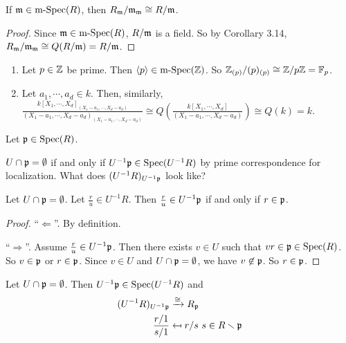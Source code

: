 \begin{corollary}\label{3.15}
    If $\mathfrak{m} \in \operatorname{m-Spec}(R)$, then $R_{\mathfrak{m}}/\mathfrak{m}_{\mathfrak{m}} \cong R/\mathfrak{m}$.
\end{corollary}

\begin{proof}
    Since $\mathfrak{m} \in \operatorname{m-Spec}(R)$, $R/\mathfrak{m}$ is a field. So by Corollary 3.14, $R_{\mathfrak{m}}/\mathfrak{m}_{\mathfrak{m}} \cong Q(R/\mathfrak{m}) = R/\mathfrak{m}$.
\end{proof}

\begin{example*}
    \begin{enumerate}
        \item Let $p \in \mathbb{Z}$ be prime. Then $\langle p \rangle \in \operatorname{m-Spec}(\mathbb{Z})$. So $\mathbb{Z}_{(p)}/(p)_{(p)} \cong \mathbb{Z}/p\mathbb{Z} = \mathbb{F}_p$.
        \item 
            Let $a_1,\cdots,a_d \in k$. Then, similarly, $\frac{k[X_1,\cdots,X_d]_{(X_1-a_1,\cdots,X_d-a_d)}}{(X_1-a_1,\cdots,X_d-a_d)_{(X_1-a_1,\cdots,X_d-a_d)}} \cong Q(\frac{k[X_1,\cdots,X_d]}{(X_1-a_1,\cdots,X_d-a_d)}) \cong Q(k) = k$. 
    \end{enumerate}
\end{example*}

\noindent Let $\mathfrak{p} \in \operatorname{Spec}(R)$. 

\begin{question*}
    $U \cap \mathfrak{p} = \emptyset$ if and only if $U^{-1}\mathfrak{p} \in \operatorname{Spec}(U^{-1}R)$ by prime correspondence for localization. What does $(U^{-1}R)_{U^{-1}\mathfrak{p}}$ look like?
\end{question*}

\begin{lemma}\label{3.16}
    Let $U \cap \mathfrak{p} = \emptyset$. Let $\frac{r}{u} \in U^{-1}R$. Then $\frac{r}{u} \in U^{-1}\mathfrak{p}$ if and only if $r \in \mathfrak{p}$. 
\end{lemma}

\begin{proof}
    ``$\Leftarrow$''. By definition. \par 
    ``$\Rightarrow$''. Assume $\frac{r}{u} \in U^{-1}\mathfrak{p}$. Then there exists $v \in U$ such that $vr \in \mathfrak{p} \in \operatorname{Spec}(R)$. So $v \in \mathfrak{p}$ or $r \in \mathfrak{p}$. Since $v \in U$ and $U \cap \mathfrak{p} = \emptyset$, we have $v \not \in \mathfrak{p}$. So $r \in \mathfrak{p}$.
\end{proof}

\begin{proposition}\label{3.17}
    Let $U \cap \mathfrak{p} = \emptyset$. Then $U^{-1}\mathfrak{p} \in \operatorname{Spec}(U^{-1}R)$ and 
    \begin{align*}
        (U^{-1}R)_{U^{-1}\mathfrak{p}} &\xrightarrow \cong R_{\mathfrak{p}} \\
        \frac{r/1}{s/1} &\mapsfrom r/s \ s \in R \smallsetminus \mathfrak{p} 
    \end{align*}
\end{proposition}

